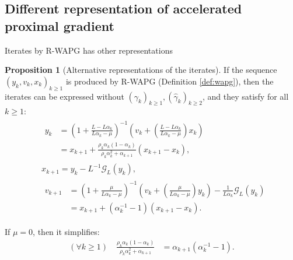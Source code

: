 \documentclass[11pt]{beamer}
\theoremstyle{definition}
\newtheorem{proposition}{Proposition}[section]
\begin{document}
    \subsection{Different representation of accelerated proximal gradient}
        \begin{frame}{Iterates by R-WAPG has other representations}
            \begin{proposition}[Alternative representations of the iterates]\label{prop:wapg-first-equivalent-repr}
                If the sequence $(y_k, v_k, x_k)_{k \ge 1}$ is produced by R-WAPG (Definition \ref{def:wapg}),
                then the iterates can be expressed without $(\gamma_k)_{k \ge1},(\hat \gamma_k)_{k \ge 2}$, and they satisfy for all $k\ge 1$: 
                {\footnotesize
                \begin{align}
                    & \begin{aligned}
                        y_{k} &=
                        \left(
                            1 + \frac{L - L\alpha_{k}}{L\alpha_{k} - \mu}
                        \right)^{-1}
                        \left(
                            v_{k} +
                            \left(\frac{L - L\alpha_{k}}{L\alpha_{k} - \mu} \right) x_{k}
                        \right)
                        \\
                        &= x_{k + 1} +
                        \frac{\rho_k\alpha_k(1 - \alpha_k)}
                        {\rho_k\alpha_k^2 + \alpha_{k + 1}}(x_{k + 1} - x_k), 
                    \end{aligned}
                    \\
                    & x_{k + 1} =
                    y_k - L^{-1} \mathcal G_L (y_k),
                    \\
                    & \begin{aligned}
                        v_{k + 1} 
                        &=
                        \left(
                            1 + \frac{\mu}{L \alpha_k - \mu}
                        \right)^{-1}
                        \left(
                            v_k +
                            \left(\frac{\mu}{L \alpha_k - \mu}\right) y_k
                        \right) - \frac{1}{L\alpha_{k}}\mathcal G_L (y_k)
                        \\
                        &= 
                        x_{k + 1} + (\alpha_k^{-1} - 1)(x_{k + 1} - x_k).
                    \end{aligned}
                \end{align}
                }
            \end{proposition}
            If $\mu = 0$, then it simplifies:
            \begin{align*}
                (\forall k \ge 1) \quad
                \frac{\rho_k\alpha_k(1 - \alpha_k)}{\rho_k\alpha_k^2 + \alpha_{k + 1}}
                & = \alpha_{k + 1}(\alpha_k^{-1} - 1).
            \end{align*}
        \end{frame}
\end{document}
